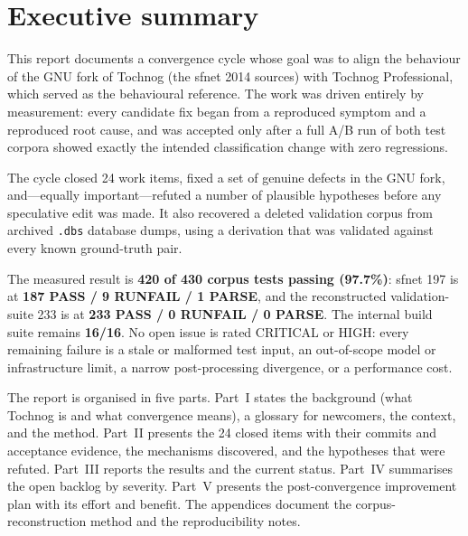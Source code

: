 \documentclass[11pt,a4paper]{report}
\newcommand{\code}[1]{\texttt{#1}}
\begin{document}
\chapter*{Executive summary}

This report documents a convergence cycle whose goal was to align the behaviour
of the GNU fork of Tochnog (the sfnet 2014 sources) with Tochnog Professional,
which served as the behavioural reference. The work was driven entirely by
measurement: every candidate fix began from a reproduced symptom and a reproduced
root cause, and was accepted only after a full A/B run of both test corpora
showed exactly the intended classification change with zero regressions.

The cycle closed 24 work items, fixed a set of genuine defects in the GNU fork,
and---equally important---refuted a number of plausible hypotheses before any
speculative edit was made. It also recovered a deleted validation corpus from
archived \code{.dbs} database dumps, using a derivation that was validated
against every known ground-truth pair.

The measured result is \textbf{420 of 430 corpus tests passing (97.7\%)}: sfnet
197 is at \textbf{187 PASS / 9 RUNFAIL / 1 PARSE}, and the reconstructed
validation-suite 233 is at \textbf{233 PASS / 0 RUNFAIL / 0 PARSE}. The internal
build suite remains \textbf{16/16}. No open issue is rated CRITICAL or HIGH:
every remaining failure is a stale or malformed test input, an out-of-scope
model or infrastructure limit, a narrow post-processing divergence, or a
performance cost.

The report is organised in five parts. Part~I states the background (what
Tochnog is and what convergence means), a glossary for newcomers, the context,
and the method.
Part~II presents the 24 closed items with their commits and acceptance evidence,
the mechanisms discovered, and the hypotheses that were refuted. Part~III reports
the results and the current status. Part~IV summarises the open backlog by
severity. Part~V presents the post-convergence improvement plan with its effort
and benefit. The appendices document the corpus-reconstruction method and the
reproducibility notes.

\tableofcontents

\end{document}
